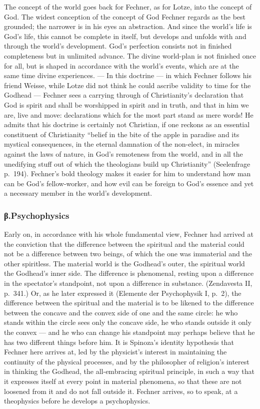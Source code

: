 \documentclass[12pt,a4paper]{book}
\newcommand{\opage}[1]{\marginnote{\footnotesize\textit{[#1]}}}
\begin{document}
The concept of the world goes back for Fechner, as for Lotze, into the concept of
God. The widest conception of the concept of God Fechner regards as the best
grounded; the narrower is in his eyes an abstraction. And since the world's life
is God's life, this cannot be complete in itself, but develops and unfolds with
and through the world's development. God's perfection consists not in finished
completeness but in unlimited advance. The divine world-plan is not finished once
for all, but is shaped in accordance with the world's events, which are at the
same time divine experiences. --- In this doctrine --- in which Fechner follows
his friend Weisse, while Lotze did not think he could ascribe validity to time
for the Godhead --- Fechner sees a carrying through of Christianity's declaration
that God is spirit and shall be worshipped in spirit and in truth, and that in
him we are, live and move: declarations which for the most part stand as mere
words! He admits that his doctrine is certainly not Christian, if one reckons as
an essential constituent of Christianity ``belief in the bite of the apple in
paradise and its mystical consequences, in the eternal damnation of the
non-elect, in miracles against the laws of nature, in God's remoteness from the
world, and in all the unedifying stuff out of which the theologians build up
Christianity'' (Seelenfrage p.~194). Fechner's bold theology makes it easier for
him to understand how man can be God's fellow-worker, and how evil can be foreign
to God's essence and yet a necessary member in the world's development.

\subsubsection*{β.\quad Psychophysics}

\opage{531}Early on, in accordance with his whole fundamental view, Fechner had arrived at
the conviction that the difference between the spiritual and the material could
not be a difference between two beings, of which the one was immaterial and the
other spiritless. The material world is the Godhead's outer, the spiritual world
the Godhead's inner side. The difference is phenomenal, resting upon a difference
in the spectator's standpoint, not upon a difference in substance. (Zendavesta
II, p.~341.) Or, as he later expressed it (Elemente der Psychophysik I, p.~2),
the difference between the spiritual and the material is to be likened to the
difference between the concave and the convex side of one and the same circle: he
who stands within the circle sees only the concave side, he who stands outside it
only the convex --- and he who can change his standpoint may perhaps believe that
he has two different things before him. It is Spinoza's identity hypothesis that
Fechner here arrives at, led by the physicist's interest in maintaining the
continuity of the physical processes, and by the philosopher of religion's
interest in thinking the Godhead, the all-embracing spiritual principle, in such
a way that it expresses itself at every point in material phenomena, so that
these are not loosened from it and do not fall outside it. Fechner arrives, so to
speak, at a theophysics before he develops a psychophysics.
\end{document}
